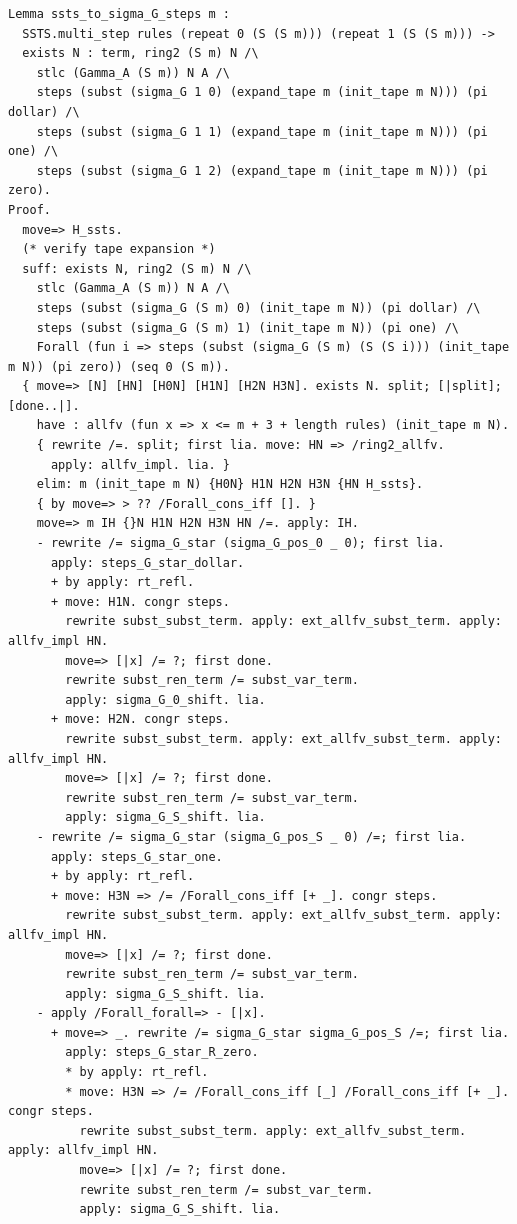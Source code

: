 \documentclass[10pt,a4paper]{amsart}
\begin{document}
\begin{lstlisting}
Lemma ssts_to_sigma_G_steps m :
  SSTS.multi_step rules (repeat 0 (S (S m))) (repeat 1 (S (S m))) ->
  exists N : term, ring2 (S m) N /\
    stlc (Gamma_A (S m)) N A /\
    steps (subst (sigma_G 1 0) (expand_tape m (init_tape m N))) (pi dollar) /\
    steps (subst (sigma_G 1 1) (expand_tape m (init_tape m N))) (pi one) /\
    steps (subst (sigma_G 1 2) (expand_tape m (init_tape m N))) (pi zero).
Proof.
  move=> H_ssts.
  (* verify tape expansion *)
  suff: exists N, ring2 (S m) N /\
    stlc (Gamma_A (S m)) N A /\
    steps (subst (sigma_G (S m) 0) (init_tape m N)) (pi dollar) /\
    steps (subst (sigma_G (S m) 1) (init_tape m N)) (pi one) /\
    Forall (fun i => steps (subst (sigma_G (S m) (S (S i))) (init_tape m N)) (pi zero)) (seq 0 (S m)).
  { move=> [N] [HN] [H0N] [H1N] [H2N H3N]. exists N. split; [|split]; [done..|].
    have : allfv (fun x => x <= m + 3 + length rules) (init_tape m N).
    { rewrite /=. split; first lia. move: HN => /ring2_allfv.
      apply: allfv_impl. lia. }
    elim: m (init_tape m N) {H0N} H1N H2N H3N {HN H_ssts}.
    { by move=> > ?? /Forall_cons_iff []. }
    move=> m IH {}N H1N H2N H3N HN /=. apply: IH.
    - rewrite /= sigma_G_star (sigma_G_pos_0 _ 0); first lia.
      apply: steps_G_star_dollar.
      + by apply: rt_refl.
      + move: H1N. congr steps.
        rewrite subst_subst_term. apply: ext_allfv_subst_term. apply: allfv_impl HN.
        move=> [|x] /= ?; first done.
        rewrite subst_ren_term /= subst_var_term.
        apply: sigma_G_0_shift. lia.
      + move: H2N. congr steps.
        rewrite subst_subst_term. apply: ext_allfv_subst_term. apply: allfv_impl HN.
        move=> [|x] /= ?; first done.
        rewrite subst_ren_term /= subst_var_term.
        apply: sigma_G_S_shift. lia.
    - rewrite /= sigma_G_star (sigma_G_pos_S _ 0) /=; first lia.
      apply: steps_G_star_one.
      + by apply: rt_refl.
      + move: H3N => /= /Forall_cons_iff [+ _]. congr steps.
        rewrite subst_subst_term. apply: ext_allfv_subst_term. apply: allfv_impl HN.
        move=> [|x] /= ?; first done.
        rewrite subst_ren_term /= subst_var_term.
        apply: sigma_G_S_shift. lia.
    - apply /Forall_forall=> - [|x].
      + move=> _. rewrite /= sigma_G_star sigma_G_pos_S /=; first lia.
        apply: steps_G_star_R_zero.
        * by apply: rt_refl.
        * move: H3N => /= /Forall_cons_iff [_] /Forall_cons_iff [+ _]. congr steps.
          rewrite subst_subst_term. apply: ext_allfv_subst_term. apply: allfv_impl HN.
          move=> [|x] /= ?; first done.
          rewrite subst_ren_term /= subst_var_term.
          apply: sigma_G_S_shift. lia.

\end{lstlisting}
\end{document}
